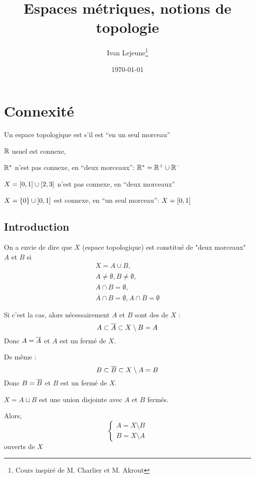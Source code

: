 \documentclass[french,a4paper,10pt]{article}
\title{\color{astral} \sffamily \bfseries Espaces métriques, notions de topologie}
\author{Ivan Lejeune\thanks{Cours inspiré de M. Charlier et M. Akrout}}
\date{\today}
\begin{document}
	\maketitle
	
	\section{Connexité}
	
	\begin{remark}[Idée]
		Un espace topologique est  s'il est ``en un seul morceau''
	\end{remark}
	
	\begin{example}
		$\mathbb{R}$ usuel est connexe,

		$\mathbb{R}^\ast$ n'est pas connexe, en ``deux morceaux'': $\mathbb{R}^\ast= \mathbb{R}^+ \cup \mathbb{R}^-$

		$X = \mathopen{[}0,1\mathclose{]} \cup \mathopen{[}2,3\mathclose{]}$ n'est pas connexe, en ``deux morceaux''

		$X = \{0\} \cup \mathopen{]}0,1\mathclose{]}$ est connexe, en ``un seul morceau'': $X=\mathopen{[}0,1\mathclose{]}$
	\end{example}
	
	\medskip

	\subsection{Introduction}

	On a envie de dire que $X$ (espace topologique) est constitué de "deux morceaux" $A$ et $B$
	si 
	\[\begin{gathered}
		X=A\cup B,\\
		A\neq\emptyset, B\neq\emptyset,\\
		A\cap B=\emptyset,\\
		\overline{A}\cap B=\emptyset, A\cap\overline{B}=\emptyset
	\end{gathered}\]
	
	Si c'est la cas, alors nécessairement $A$ et $B$ sont des  de $X$ :
	\[
		A\subset \overline{A}\subset X\setminus B=A
	\]
	Donc $A=\overline{A}$ et $A$ est un fermé de $X$.

	De même :
	\[
		B\subset \overline{B}\subset X\setminus A=B
	\]
	Donc $B=\overline{B}$ et $B$ est un fermé de $X$.

	$X=A\sqcup B$ est une union disjointe avec $A$ et $B$ fermés.

	Alors, 
	\[\begin{cases}
		A = X\setminus B\\
		B = X\setminus A
	\end{cases}\]
	ouverts de $X$
\end{document}
